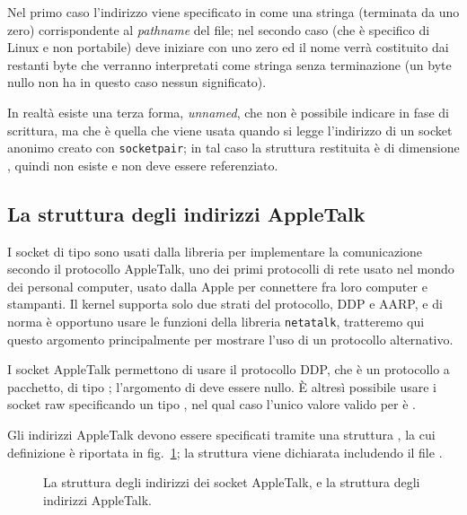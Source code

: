 Nel primo caso l'indirizzo viene specificato in  come una
stringa (terminata da uno zero) corrispondente al \textit{pathname} del file;
nel secondo caso (che è specifico di Linux e non portabile) 
deve iniziare con uno zero ed il nome verrà costituito dai restanti byte che
verranno interpretati come stringa senza terminazione (un byte nullo non ha in
questo caso nessun significato).

In realtà esiste una terza forma, \textit{unnamed}, che non è possibile
indicare in fase di scrittura, ma che è quella che viene usata quando si legge
l'indirizzo di un socket anonimo creato con \texttt{socketpair}; in tal caso
la struttura restituita è di dimensione , quindi
 non esiste e non deve essere referenziato.

\subsection{La struttura degli indirizzi AppleTalk}
\label{sec:sock_sa_appletalk}

I socket di tipo  sono usati dalla libreria
 per implementare la comunicazione secondo il protocollo
AppleTalk, uno dei primi protocolli di rete usato nel mondo dei personal
computer, usato dalla Apple per connettere fra loro computer e stampanti. Il
kernel supporta solo due strati del protocollo, DDP e AARP, e di norma è
opportuno usare le funzioni della libreria \texttt{netatalk}, tratteremo qui
questo argomento principalmente per mostrare l'uso di un protocollo
alternativo.

I socket AppleTalk permettono di usare il protocollo DDP, che è un protocollo
a pacchetto, di tipo ; l'argomento  di
 deve essere nullo. È altresì possibile usare i socket raw
specificando un tipo , nel qual caso l'unico valore valido
per  è .

Gli indirizzi AppleTalk devono essere specificati tramite una struttura
, la cui definizione è riportata in
fig.~\ref{fig:sock_sa_atalk_struct}; la struttura viene dichiarata includendo
il file .

\begin{figure}[!htb]
  \footnotesize \centering
  \begin{minipage}[c]{0.80\textwidth}
  \end{minipage} 
  \caption{La struttura  degli indirizzi dei socket
    AppleTalk, e la struttura  degli indirizzi AppleTalk.}
  \label{fig:sock_sa_atalk_struct}
\end{figure}

